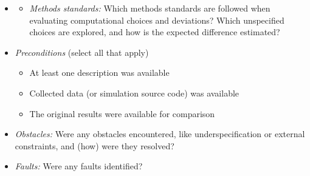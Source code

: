\documentclass[authordate, meta]{jote-new-article}
\begin{document}
\begin{fullWide}[Box 5]
		\begin{itemize}
			\item[]
			\begin{itemize}[leftmargin=2.5em, label={\hspace{1em}\textbullet}]
				\item \emph{Methods standards:} Which methods standards are followed when evaluating computational choices and deviations? Which unspecified choices are explored, and how is the expected difference estimated?
			\end{itemize}
			\item \emph{Preconditions} (select all that apply)
			\begin{itemize}[leftmargin=2.5em, label={\hspace{1em}\textbullet}]
				\item {} At least one description was available
				\item {} Collected data (or simulation source code) was available
				\item {} The original results were available for comparison
			\end{itemize}
			\item \emph{Obstacles:} Were any obstacles encountered, like underspecification or external constraints, and (how) were they resolved?
			\item \emph{Faults:} Were any faults identified?
		\end{itemize}
		
	\end{fullWide}
\end{document}
